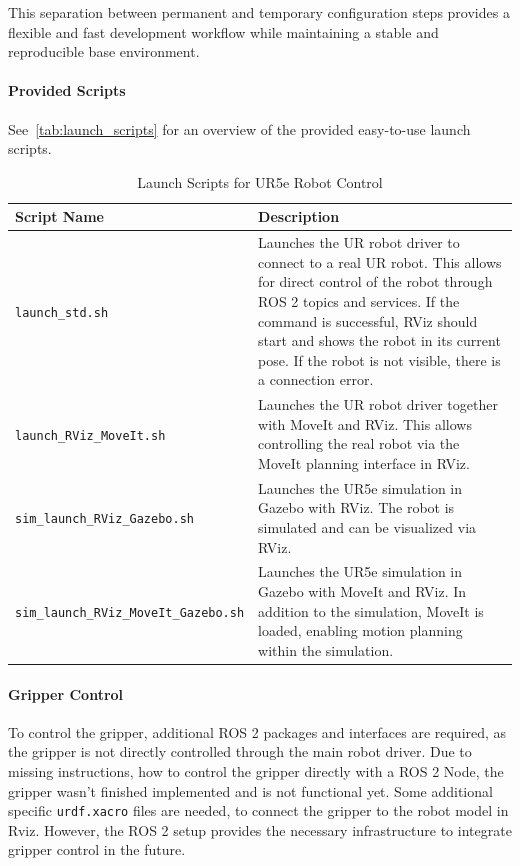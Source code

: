 This separation between permanent and temporary configuration steps provides a flexible and fast development workflow while maintaining a stable and reproducible base environment.


\paragraph{Provided Scripts}
See~\autoref{tab:launch_scripts} for an overview of the provided easy-to-use launch scripts.
\begin{table}[!h]
    \centering
    \renewcommand{\arraystretch}{1.5}
    \begin{tabular}{|>{\raggedright\arraybackslash}p{4.5cm}|>{\raggedright\arraybackslash}p{10.5cm}|}
        \hline
        \rowcolor{blue!10}
        \textbf{Script Name} & \textbf{Description} \\
        \hline
        \texttt{launch\_std.sh} & Launches the UR robot driver to connect to a real UR robot. This allows for direct control of the robot through ROS 2 topics and services. If the command is successful, RViz should start and shows the robot in its current pose. If the robot is not visible, there is a connection error. \\
        \hline
        \texttt{launch\_RViz\_MoveIt.sh} & Launches the UR robot driver together with MoveIt and RViz. This allows controlling the real robot via the MoveIt planning interface in RViz. \\
        \hline
        \texttt{sim\_launch\_RViz\allowbreak\_Gazebo.sh} & Launches the UR5e simulation in Gazebo with RViz. The robot is simulated and can be visualized via RViz. \\
        \hline
        \texttt{sim\_launch\_RViz\allowbreak\_MoveIt\allowbreak\_Gazebo.sh} & Launches the UR5e simulation in Gazebo with MoveIt and RViz. In addition to the simulation, MoveIt is loaded, enabling motion planning within the simulation. \\
        \hline
    \end{tabular}
    \caption{Launch Scripts for UR5e Robot Control}
    \label{tab:launch_scripts}
\end{table}


\paragraph{Gripper Control}
To control the gripper, additional ROS 2 packages and interfaces are required, as the gripper is not directly controlled through the main robot driver. Due to missing instructions, how to control the gripper directly with a ROS 2 Node, the gripper wasn't finished implemented and is not functional yet. Some additional specific \texttt{urdf.xacro} files are needed, to connect the gripper to the robot model in Rviz. However, the ROS 2 setup provides the necessary infrastructure to integrate gripper control in the future.


